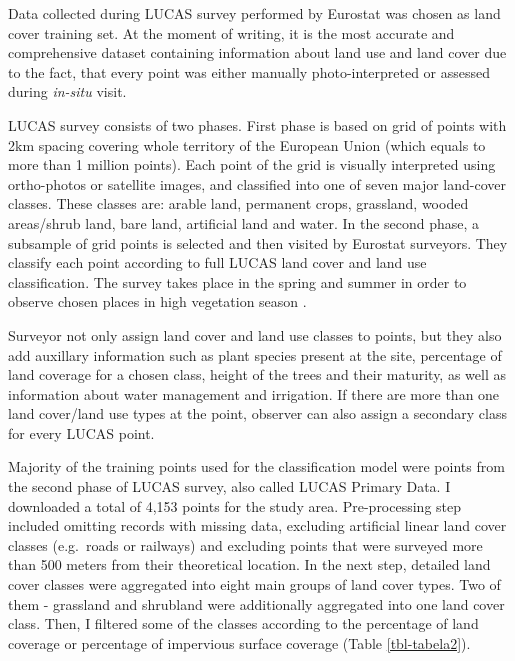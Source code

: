 \documentclass{amuthesis}
\begin{document}
Data collected during LUCAS survey performed by Eurostat was chosen as
land cover training set. At the moment of writing, it is the most
accurate and comprehensive dataset containing information about land use
and land cover \autocite{pflugmacher_mapping_2019} due to the fact, that
every point was either manually photo-interpreted or assessed during
\emph{in-situ} visit.

LUCAS survey consists of two phases. First phase is based on grid of
points with 2km spacing covering whole territory of the European Union
(which equals to more than 1 million points). Each point of the grid is
visually interpreted using ortho-photos or satellite images, and
classified into one of seven major land-cover classes. These classes
are: arable land, permanent crops, grassland, wooded areas/shrub land,
bare land, artificial land and water. In the second phase, a subsample
of grid points is selected and then visited by Eurostat surveyors. They
classify each point according to full LUCAS land cover and land use
classification. The survey takes place in the spring and summer in order
to observe chosen places in high vegetation season
\autocite{dandrimont_harmonised_2020}.

Surveyor not only assign land cover and land use classes to points, but
they also add auxillary information such as plant species present at the
site, percentage of land coverage for a chosen class, height of the
trees and their maturity, as well as information about water management
and irrigation. If there are more than one land cover/land use types at
the point, observer can also assign a secondary class for every LUCAS
point.

Majority of the training points used for the classification model were
points from the second phase of LUCAS survey, also called LUCAS Primary
Data. I downloaded a total of 4,153 points for the study area.
Pre-processing step included omitting records with missing data,
excluding artificial linear land cover classes (e.g.~roads or railways)
and excluding points that were surveyed more than 500 meters from their
theoretical location. In the next step, detailed land cover classes were
aggregated into eight main groups of land cover types. Two of them -
grassland and shrubland were additionally aggregated into one land cover
class. Then, I filtered some of the classes according to the percentage
of land coverage or percentage of impervious surface coverage (Table
\ref{tbl-tabela2}).
\end{document}
